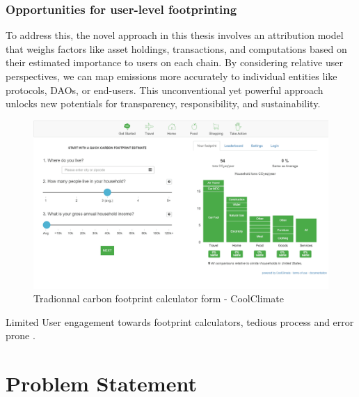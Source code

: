\documentclass[11pt]{report}
\begin{document}
\subsubsection*{Opportunities for user-level footprinting}

To address this, the novel approach in this thesis involves an attribution model that weighs factors like asset holdings, transactions, and computations based on their estimated importance to users on each chain. By considering relative user perspectives, we can map emissions more accurately to individual entities like protocols, DAOs, or end-users. This unconventional yet powerful approach unlocks new potentials for transparency, responsibility, and sustainability.

\begin{figure}[hbt!]
    \centering
    \centerline{\includegraphics[scale=0.25]{figures/carbon_footprint_calculator.png}}
    \caption[YO]{Tradionnal carbon footprint calculator form - CoolClimate\footnotemark}
    \label{fig:carbon_footprint_calculator}
\end{figure}


Limited User engagement towards footprint calculators, tedious process and error prone \cite{saloOpportunitiesLimitationsCarbon2019,mulrowStateCarbonFootprint2019}.

\section{Problem Statement}
\end{document}
